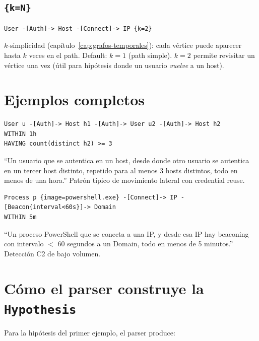 \subsection{\texttt{\{k=N\}}}

\begin{lstlisting}
User -[Auth]-> Host -[Connect]-> IP {k=2}
\end{lstlisting}

\noindent
\(k\)-simplicidad (capítulo~\ref{cap:grafos-temporales}): cada
vértice puede aparecer hasta \(k\) veces en el path. Default: \(k=1\)
(path simple). \(k=2\) permite revisitar un vértice una vez (útil
para hipótesis donde un usuario \emph{vuelve} a un host).

\section{Ejemplos completos}

\begin{ejemplo}
\begin{lstlisting}
User u -[Auth]-> Host h1 -[Auth]-> User u2 -[Auth]-> Host h2
WITHIN 1h
HAVING count(distinct h2) >= 3
\end{lstlisting}

\noindent
``Un usuario que se autentica en un host, desde donde otro usuario
se autentica en un tercer host distinto, repetido para al menos 3
hosts distintos, todo en menos de una hora.'' Patrón típico de
movimiento lateral con credential reuse.
\end{ejemplo}

\begin{ejemplo}
\begin{lstlisting}
Process p {image=powershell.exe} -[Connect]-> IP -[Beacon{interval<60s}]-> Domain
WITHIN 5m
\end{lstlisting}

\noindent
``Un proceso PowerShell que se conecta a una IP, y desde esa IP hay
beaconing con intervalo $<$ 60 segundos a un Domain, todo en menos
de 5 minutos.'' Detección C2 de bajo volumen.
\end{ejemplo}

\section{Cómo el parser construye la \texttt{Hypothesis}}

Para la hipótesis del primer ejemplo, el parser produce:

